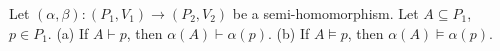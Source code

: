 Let $(\alpha, \beta): (P_1, V_1) \to (P_2, V_2)$ be a semi-homomorphism. Let $A \subseteq P_1$, $p \in P_1$. (a) If $A \vdash p$, then $\alpha(A) \vdash \alpha(p)$. (b) If $A \models p$, then $\alpha(A) \models \alpha(p)$.
